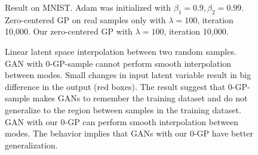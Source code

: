 \documentclass{article} %
\begin{document}
\begin{figure}[h!]
\centering
{}

\caption{Result on MNIST. Adam was initialized with $\beta_1 = 0.9, \beta_2 = 0.99$. 
\protect{} Zero-centered GP on real samples only with $\lambda = 100$, iteration 10,000.
\protect{} Our zero-centered GP with $\lambda = 100$, iteration 10,000.
}
\label{fig:mnist10k}
\end{figure}

\begin{figure}[h!]
\centering
{} 

\caption{Linear latent space interpolation between two random samples. \protect{} GAN with 0-GP-sample cannot perform smooth interpolation between modes. Small changes in input latent variable result in big difference in the output (red boxes). The result suggest that 0-GP-sample makes GANs to remember the training dataset and do not generalize to the region between samples in the training dataset. \protect{} GAN with our 0-GP can perform smooth interpolation between modes. The behavior implies that GANs with our 0-GP have better generalization.}
\label{fig:interpolation}
\end{figure}
\end{document}
